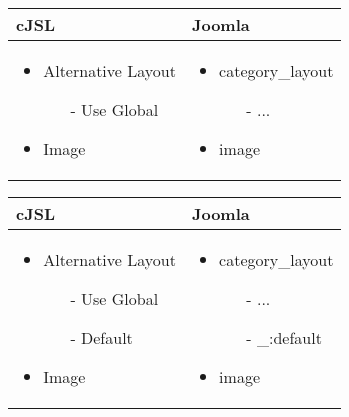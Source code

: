 \begin{minipage}{0.6\textwidth}
\begin{tabular}{|p{} | p{}|}
\hline
\textbf{cJSL} & \textbf{Joomla} \\ 
\hline
\begin{itemize}
\item Alternative Layout
    \begin{enumerate}
		\item[-] Use Global
	\end{enumerate}
\item Image
\end{itemize}
 & 
\begin{itemize}
\item category\_layout
    \begin{enumerate}
		\item[-] ...
	\end{enumerate}
\item image
\end{itemize}
\\
\hline
\end{tabular}
\end{minipage}

\begin{minipage}{0.5\textwidth}
\begin{tabular}{|p{} | p{}|}
\hline
\textbf{cJSL} & \textbf{Joomla} \\ 
\hline
\begin{itemize}
\item Alternative Layout
    \begin{enumerate}
		\item[-] Use Global
		\item[-] Default 
	\end{enumerate}
\item Image
\end{itemize}
 & 
\begin{itemize}
\item category\_layout
    \begin{enumerate}
		\item[-] ...
		\item[-] \_:default
	\end{enumerate}
\item image
\end{itemize}
\\
\hline
\end{tabular}
\end{minipage}

